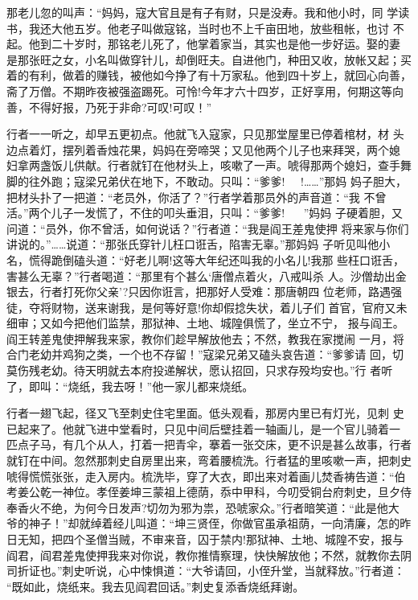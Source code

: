 那老儿忽的叫声：“妈妈，寇大官且是有子有财，只是没寿。我和他小时，同
学读书，我还大他五岁。他老子叫做寇铭，当时也不上千亩田地，放些租帐，也讨
不起。他到二十岁时，那铭老儿死了，他掌着家当，其实也是他一步好运。娶的妻
是那张旺之女，小名叫做穿针儿，却倒旺夫。自进他门，种田又收，放帐又起；买
着的有利，做着的赚钱，被他如今挣了有十万家私。他到四十岁上，就回心向善，
斋了万僧。不期昨夜被强盗踢死。可怜!今年才六十四岁，正好享用，何期这等向
善，不得好报，乃死于非命?可叹!可叹！”

行者一一听之，却早五更初点。他就飞入寇家，只见那堂屋里已停着棺材，材
头边点着灯，摆列着香烛花果，妈妈在旁啼哭；又见他两个儿子也来拜哭，两个媳
妇拿两盏饭儿供献。行者就钉在他材头上，咳嗽了一声。唬得那两个媳妇，查手舞
脚的往外跑；寇梁兄弟伏在地下，不敢动。只叫：“爹爹!，，!……”那妈
妈子胆大，把材头扑了一把道：“老员外，你活了？”行者学着那员外的声音道：“我
不曾活。”两个儿子一发慌了，不住的叩头垂泪，只叫：“爹爹!，，！”妈妈
子硬着胆，又问道：“员外，你不曾活，如何说话？”行者道：“我是阎王差鬼使押
将来家与你们讲说的。”……说道：“那张氏穿针儿枉口诳舌，陷害无辜。”那妈妈
子听见叫他小名，慌得跪倒磕头道：“好老儿啊!这等大年纪还叫我的小名儿!我那
些枉口诳舌，害甚么无辜？”行者喝道：“那里有个甚么‘唐僧点着火，八戒叫杀
人。沙僧劫出金银去，行者打死你父亲’?只因你诳言，把那好人受难：那唐朝四
位老师，路遇强徒，夺将财物，送来谢我，是何等好意!你却假捻失状，着儿子们
首官，官府又未细审；又如今把他们监禁，那狱神、土地、城隍俱慌了，坐立不宁，
报与阎王。阎王转差鬼使押解我来家，教你们趁早解放他去；不然，教我在家搅闹
一月，将合门老幼并鸡狗之类，一个也不存留！”寇梁兄弟又磕头哀告道：“爹爹请
回，切莫伤残老幼。待天明就去本府投递解状，愿认招回，只求存殁均安也。”行
者听了，即叫：“烧纸，我去呀！”他一家儿都来烧纸。

行者一翅飞起，径又飞至刺史住宅里面。低头观看，那房内里已有灯光，见刺
史已起来了。他就飞进中堂看时，只见中间后壁挂着一轴画儿，是一个官儿骑着一
匹点子马，有几个从人，打着一把青伞，搴着一张交床，更不识是甚么故事，行者
就钉在中间。忽然那刺史自房里出来，弯着腰梳洗。行者猛的里咳嗽一声，把刺史
唬得慌慌张张，走入房内。梳洗毕，穿了大衣，即出来对着画儿焚香祷告道：“伯
考姜公乾一神位。孝侄姜坤三蒙祖上德荫，忝中甲科，今叨受铜台府刺史，旦夕侍
奉香火不绝，为何今日发声?切勿为邪为祟，恐唬家众。”行者暗笑道：“此是他大
爷的神子！”却就绰着经儿叫道：“坤三贤侄，你做官虽承祖荫，一向清廉，怎的昨
日无知，把四个圣僧当贼，不审来音，囚于禁内!那狱神、土地、城隍不安，报与
阎君，阎君差鬼使押我来对你说，教你推情察理，快快解放他；不然，就教你去阴
司折证也。”刺史听说，心中悚惧道：“大爷请回，小侄升堂，当就释放。”行者道：
“既如此，烧纸来。我去见阎君回话。”刺史复添香烧纸拜谢。

